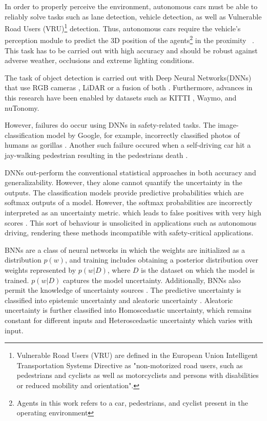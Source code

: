 \documentclass[10pt,twocolumn,letterpaper]{article}
\begin{document}
In order to properly perceive the environment, autonomous cars must be able to reliably solve tasks such as lane detection, vehicle detection, as well as Vulnerable Road Users (VRU)\footnote{Vulnerable Road Users (VRU) are defined in the European Union Intelligent Transportation Systems Directive as "non-motorized road users, such as pedestrians and cyclists as well as motorcyclists and persons with disabilities or reduced mobility and orientation".} detection. Thus, autonomous cars require the vehicle's perception module to predict the 3D position of the agents\footnote{Agents in this work refers to a car, pedestrians, and cyclist present in the operating environment} in the proximity ~\cite{KITTI2012}. This task has to be carried out with high accuracy and should be robust against adverse weather, occlusions and extreme lighting conditions. 

The task of object detection is carried out with Deep Neural Networks(DNNs) \cite{Rao2018, Arnold2019} that use RGB cameras \cite{Chen2016, Mousavian2017, Chabot2017, Chen2017}, LiDAR \cite{VOTE3DEEP2017, Zhou2018, Sahba2019, Simon2018, Xiang2015} or a fusion of both \cite{Du2018, FPointnet2018, AVOD2018, FrustumConvnet2019}. Furthermore, advances in this research have been enabled by datasets such as KITTI \cite{KITTI2012}, Waymo\cite{Waymo2019}, and nuTonomy\cite{Caesar2020}.

However, failures do occur using DNNs in safety-related tasks. \label{GoogleFailure} The image-classification model by Google, for example, incorrectly classified photos of humans as gorillas \cite{Mulshine2015}. Another such failure occured \label{Uberfailure} when a self-driving car hit a jay-walking pedestrian resulting in the pedestrians death \cite{SLJCW2018}.

DNNs out-perform the conventional statistical approaches in both accuracy and generalizability. However, they alone cannot quantify the uncertainty in the outputs. The classification models provide predictive probabilities which are softmax outputs of a model. However, the softmax probabilities are incorrectly interpreted as an uncertainty metric. which leads to false positives with very high scores \cite{Blundell2015, Malinin2018}. This sort of behaviour is unsolicited in applications such as autonomous driving, rendering these methods incompatible with safety-critical applications. 

BNNs \cite{tran2016edward, Shridhar2018, Tran2019} are a class of neural networks in which the weights are initialized as a distribution $p(w)$, and training includes obtaining a posterior distribution over weights represented by $p (w|D)$, where $D$ is the dataset on which the model is trained. $p (w|D)$ captures the model uncertainty. Additionally, BNNs also permit the knowledge of uncertainty sources \cite{Henne2020}. The predictive uncertainty is classified into epistemic uncertainty and aleatoric uncertainty \cite{Kendall2017}. Aleatoric uncertainty is further classified into Homoscedastic uncertainty, which remains constant for different inputs and Heteroscedastic uncertainty which varies with input.
\end{document}
